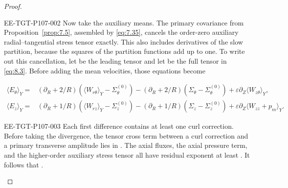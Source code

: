 \begin{proof}
\begin{EESegment}{EE-TGT-P107-002}
Now take the auxiliary means. The primary covariance from Proposition~\ref{prop:7.5}, assembled by
\eqref{eq:7.35}, cancels the order-zero auxiliary radial--tangential stress tensor exactly. This
also includes derivatives of the slow partition, because the squares of the partition functions add
up to one. To write out this cancellation, let
 be the leading tensor and let
 be the full tensor in \eqref{eq:8.3}. Before adding the mean
velocities, those equations become
\end{EESegment}
\begin{equation}
\begin{aligned}
\langle E_\theta\rangle_Y
={}&(\partial_R+2/R)(\langle W_{r\theta}\rangle_Y-\Sigma_\theta^{(0)})
 -(\partial_R+2/R)(\Sigma_\theta-\Sigma_\theta^{(0)})
 +\varepsilon\partial_Z\langle W_{z\theta}\rangle_Y,\\
\langle E_z\rangle_Y
={}&(\partial_R+1/R)(\langle W_{rz}\rangle_Y-\Sigma_z^{(0)})
 -(\partial_R+1/R)(\Sigma_z-\Sigma_z^{(0)})
 +\varepsilon\partial_Z\langle W_{zz}+p_m\rangle_Y.
\end{aligned}
\tag{9.11}\label{eq:9.11}
\end{equation}
\begin{EESegment}{EE-TGT-P107-003}
Each first difference contains at least one curl correction. Before taking the divergence, the tensor
cross term between a curl correction and a primary transverse amplitude lies in
. The axial fluxes, the axial pressure term, and the
higher-order auxiliary stress tensor all have residual exponent at least
. It follows that
.
\end{EESegment}


\end{proof}

